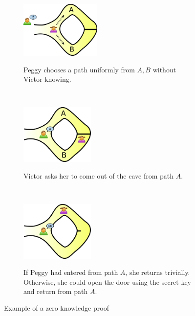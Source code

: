 \begin{figure}[h!]
    \centering
    \begin{subfigure}[b]{0.8\textwidth}
    \centering
        \includegraphics[width=0.44\textwidth]{Figures/Zkip_alibaba1.png}
        \label{fig:zkp1}
        \caption{Peggy chooses a path uniformly from $A, B$ without Victor knowing.}
    \end{subfigure}
    \\
    \begin{subfigure}[b]{0.8\textwidth}
    \centering
        \includegraphics[width=0.4\textwidth]{Figures/Zkip_alibaba2.png}
        \label{fig:zkp2}
        \caption{Victor asks her to come out of the cave from path $A$.}
    \end{subfigure}
    \\
    \begin{subfigure}[b]{0.8\textwidth}
    \centering
        \includegraphics[width=0.4\textwidth]{Figures/Zkip_alibaba3.png}
        \label{fig:zkp3}
        \caption{If Peggy had entered from path $A$, she returns trivially. Otherwise, she could open the door using the secret key and return from path $A$.}
    \end{subfigure}
    
    \caption{Example of a zero knowledge proof}
    \label{fig:zkp_alibaba}
    \end{figure}
    
